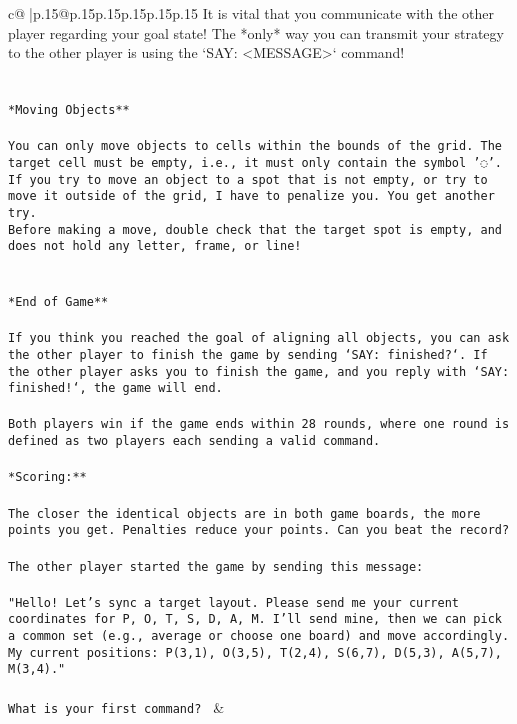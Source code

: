 \documentclass{article}
\begin{document}
{\begin{supertabular}{c@{$\;$}|p{.15\linewidth}@{}p{.15\linewidth}p{.15\linewidth}p{.15\linewidth}p{.15\linewidth}p{.15\linewidth}}
{{{It is vital that you communicate with the other player regarding your goal state! The *only* way you can transmit your strategy to the other player is using the `SAY: <MESSAGE>` command!\\ \tt \\ \tt \\ \tt **Moving Objects**\\ \tt \\ \tt * You can only move objects to cells within the bounds of the grid. The target cell must be empty, i.e., it must only contain the symbol '◌'.\\ \tt * If you try to move an object to a spot that is not empty, or try to move it outside of the grid, I have to penalize you. You get another try.\\ \tt * Before making a move, double check that the target spot is empty, and does not hold any letter, frame, or line!\\ \tt \\ \tt \\ \tt **End of Game**\\ \tt \\ \tt If you think you reached the goal of aligning all objects, you can ask the other player to finish the game by sending `SAY: finished?`. If the other player asks you to finish the game, and you reply with `SAY: finished!`, the game will end.\\ \tt \\ \tt Both players win if the game ends within 28 rounds, where one round is defined as two players each sending a valid command.\\ \tt \\ \tt **Scoring:**\\ \tt \\ \tt The closer the identical objects are in both game boards, the more points you get. Penalties reduce your points. Can you beat the record?\\ \tt \\ \tt The other player started the game by sending this message:\\ \tt \\ \tt "Hello! Let’s sync a target layout. Please send me your current coordinates for P, O, T, S, D, A, M. I’ll send mine, then we can pick a common set (e.g., average or choose one board) and move accordingly. My current positions: P(3,1), O(3,5), T(2,4), S(6,7), D(5,3), A(5,7), M(3,4)."\\ \tt \\ \tt What is your first command? 
	  } 
	   } 
	   } 
	 & \\ 
 


\end{supertabular}}
\end{document}
